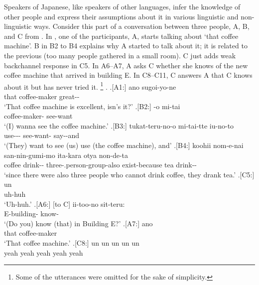 Speakers of Japanese, like speakers of other languages,
infer the knowledge of other people and
express their assumptions about it in various linguistic and non-linguistic ways.
Consider this part of a conversation between three people, A, B, and C
from  \cite{Den_2007_SAC}.
In \Next[-A1],
one of the participants, A, starts talking about  `that coffee machine'.
B in B2 to B4 explains why A started to talk about it;
it is related to the previous  (too many people gathered in a small room).
C just adds weak backchannel response in C5.
In A6--A7,
A asks C whether she knows of the new coffee machine that arrived in building E.
In C8--C11,
C answers A that
C knows about it but has never tried it.%
	\footnote{
	Some of the utterances were omitted for the sake of simplicity.
	}
%
\ex.
 \ag.[A1:] ano  sugoi-yo-ne \\
      that coffee-maker great-- \\
      `That coffee machine is excellent, isn's it?'
 \bg.[B2:] -o mi-tai \\
          coffee-maker- see-want \\
          `(I) wanna see the coffee machine.'
 \bg.[B3:] tukat-teru-no-o mi-tai-tte iu-no-to \\
           use--- see-want- say--and \\
           `(They) want to see (us) use (the coffee machine), and'
 \bg.[B4:] koohii nom-e-nai san-nin-gumi-mo ita-kara otya non-de-ta \\
           coffee drink-- three-.person-group-also exist-because tea drink-- \\
           `since there were also three people who cannot drink coffee, they drank tea.'
 \bg.[C5:] un \\
           uh-huh \\
           `Uh-huh.'
 \bg.[A6:] [to C] ii-too-no sit-teru: \\
           {} {} E-building- know- \\
           `(Do you) know (that) in Building E?'
 \bg.[A7:] ano  \\
           that coffee-maker \\
           `That coffee machine.'
 \bg.[C8:] un un un un un \\
           yeah yeah yeah yeah yeah \\
